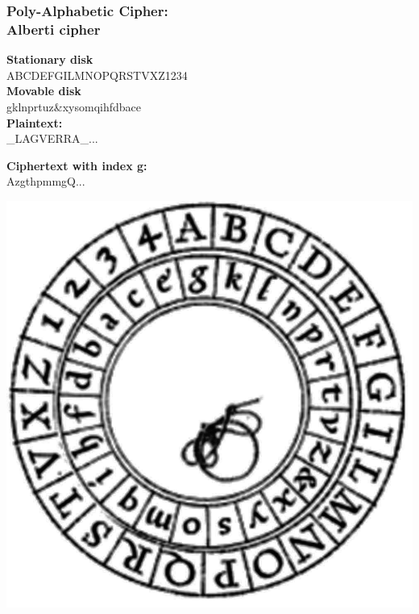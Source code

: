 \documentclass{uva-inf-presentation}
\begin{document}
\begin{frame}
\frametitle{Poly-Alphabetic Cipher:\\ Alberti cipher}

\begin{minipage}{0.55\linewidth}
\textbf{Stationary disk}\\
ABCDEFGILMNOPQRSTVXZ1234\\
\textbf{Movable disk}\\
gklnprtuz\&xysomqihfdbace\\

\textbf{Plaintext:}\\
\hspace{4ex}\_LAGVERRA\_...

\textbf{Ciphertext with index g:}\\
\hspace{4ex}AzgthpmmgQ...
\end{minipage}%
\begin{minipage}{0.45\linewidth}
\includegraphics[width=\linewidth]{Alberti_cipher_disk.JPG}
\end{minipage}

\end{frame}
\end{document}
